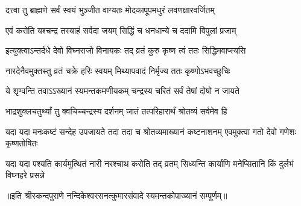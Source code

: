 \twolineshloka
{दत्त्वा तु ब्राह्मणे सर्वं स्वयं भुञ्जीत वाग्यतः}
{मोदकापूपमधुरं लवणक्षारवर्जितम्}%

\twolineshloka
{एवं करोति यश्चन्द्र तस्याहं सर्वदा जयम्}
{सिद्धिं च धनधान्ये च ददामि विपुलां प्रजाम्}%

\twolineshloka
{इत्युक्त्वाऽन्तर्दधे देवो विघ्नराजो विनायकः}
{तद् व्रतं कुरु कृष्ण त्वं ततः सिद्धिमवाप्स्यसि}%

\twolineshloka
{नारदेनैवमुक्तस्तु व्रतं चक्रे हरिः स्वयम्}
{मिथ्यापवादं निर्मृज्य ततः कृष्णोऽभवच्छुचिः}%

\twolineshloka
{ये शृण्वन्ति तवाऽऽख्यानं स्यमन्तकमणीयकम्}
{चन्द्रस्य चरितं सर्वं तेषां दोषो न जायते}%

\twolineshloka
{भाद्रशुक्लचतुर्थ्यां तु क्वचिच्चन्द्रस्य दर्शनम्}
{जातं तत्परिहारार्थं श्रोतव्यं सर्वमेव हि}%

\threelineshloka
{यदा यदा मनःकष्टं सन्देह उपजायते} 
{तदा तदा च श्रोतव्यमाख्यानं कष्टनाशनम्}
{एवमुक्त्वा गतो देवो गणेशः कृष्णतोषितः}%

\fourlineindentedshloka
{यदा यदा पश्यति कार्यमुत्थितं}
{नारी नरश्चाथ करोति तद् व्रतम्}
{सिध्यन्ति कार्याणि मनेप्सितानि}
{किं दुर्लभं विघ्नहरे प्रसन्ने}%

॥इति श्रीस्कन्दपुराणे नन्दिकेश्वरसनत्कुमारसंवादे स्यमन्तकोपाख्यानं सम्पूर्णम्॥

